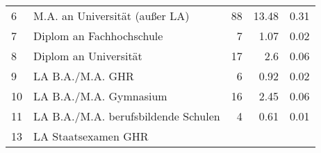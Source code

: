 \begin{longtable}{lXrrr}
     6 &
     \multicolumn{1}{X}{ M.A. an Universität (außer LA)   } &


       \num{88} &
       \num[round-mode=places,round-precision=2]{13,48} &
         \num[round-mode=places,round-precision=2]{0,31} \\

     7 &
     \multicolumn{1}{X}{ Diplom an Fachhochschule   } &


       \num{7} &
       \num[round-mode=places,round-precision=2]{1,07} &
         \num[round-mode=places,round-precision=2]{0,02} \\

     8 &
     \multicolumn{1}{X}{ Diplom an Universität   } &


       \num{17} &
       \num[round-mode=places,round-precision=2]{2,6} &
         \num[round-mode=places,round-precision=2]{0,06} \\

     9 &
     \multicolumn{1}{X}{ LA B.A./M.A. GHR   } &


       \num{6} &
       \num[round-mode=places,round-precision=2]{0,92} &
         \num[round-mode=places,round-precision=2]{0,02} \\

     10 &
     \multicolumn{1}{X}{ LA B.A./M.A. Gymnasium   } &


       \num{16} &
       \num[round-mode=places,round-precision=2]{2,45} &
         \num[round-mode=places,round-precision=2]{0,06} \\

     11 &
     \multicolumn{1}{X}{ LA B.A./M.A. berufsbildende Schulen   } &


       \num{4} &
       \num[round-mode=places,round-precision=2]{0,61} &
         \num[round-mode=places,round-precision=2]{0,01} \\

     13 &
     \multicolumn{1}{X}{ LA Staatsexamen GHR   } &



\end{longtable}
